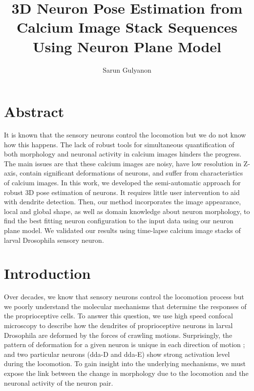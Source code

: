 \documentclass[10pt,letterpaper]{article}
\author{Sarun Gulyanon}
\title{3D Neuron Pose Estimation from Calcium Image Stack Sequences Using Neuron Plane Model}
\begin{document}
\maketitle

\section{Abstract}
It is known that the sensory neurons control the locomotion but we do not know how this happens. The lack of robust tools for simultaneous quantification of both morphology and neuronal activity in calcium images hinders the progress. The main issues are that these calcium images are noisy, have low resolution in Z-axis, contain significant deformations of neurons, and suffer from characteristics of calcium images. In this work, we developed the semi-automatic approach for robust 3D pose estimation of neurons. It requires little user intervention to aid with dendrite detection. Then, our method incorporates the image appearance, local and global shape, as well as domain knowledge about neuron morphology, to find the best fitting neuron configuration to the input data using our neuron plane model. We validated our results using time-lapse calcium image stacks of larval Drosophila sensory neuron.

\section{Introduction}
Over decades, we know that sensory neurons control the locomotion process but we poorly understand the molecular mechanisms that determine the responses of the proprioceptive cells. To answer this question, we use high speed confocal microscopy to describe how the dendrites of proprioceptive neurons in larval Drosophila are deformed by the forces of crawling motions. Surprisingly, the pattern of deformation for a given neuron is unique in each direction of motion \cite{Gulyanon2018a}; and two particular neurons (dda-D and dda-E) show strong activation level during the locomotion. To gain insight into the underlying mechanisms, we must expose the link between the change in morphology due to the locomotion and the neuronal activity of the neuron pair.
\end{document}
